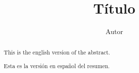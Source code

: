 \documentclass[a4paper,11pt]{article}
\title{Título}
\author{Autor}
\begin{document}
\maketitle

\begin{abstract}
This is the english version of the abstract.
\end{abstract}

\begin{abstract}
Esta es la versión en español del resumen.
\end{abstract}
\end{document}
